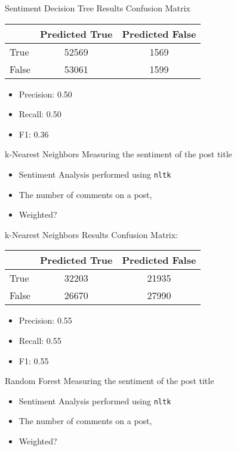 \documentclass[10pt,t]{beamer}
\newcommand{\bi}{\begin{itemize}}                                 %
\newcommand{\ei}{\end{itemize}}                                   %
\begin{document}
\begin{frame}[c]{Sentiment Decision Tree Results}
Confusion Matrix

\begin{table}
	\begin{tabular}{l | c | c }
		& Predicted True & Predicted False\\
		\hline \hline
		True & 52569 & 1569\\ 
		False & 53061 & 1599
	\end{tabular}
\end{table}
\bi
	\item Precision: 0.50
	\item Recall: 0.50
	\item F1: 0.36
\ei
\end{frame}

\begin{frame}{k-Nearest Neighbors}
Measuring the sentiment of the post title
	\bi
		\item Sentiment Analysis performed using \texttt{nltk}
		\item The number of comments on a post, 
		\item Weighted?
	\ei
\end{frame}

\begin{frame}[c]{k-Nearest Neighbors Results}
Confusion Matrix:

\begin{table}
	\begin{tabular}{l | c | c }
		& Predicted True & Predicted False\\
		\hline \hline
		True & 32203 & 21935\\ 
		False & 26670 & 27990
	\end{tabular}
\end{table}
\bi
	\item Precision: 0.55
	\item Recall: 0.55
	\item F1: 0.55
\ei
\end{frame}

\begin{frame}{Random Forest}
Measuring the sentiment of the post title
	\bi
		\item Sentiment Analysis performed using \texttt{nltk}
		\item The number of comments on a post, 
		\item Weighted?
	\ei
\end{frame}
\end{document}
